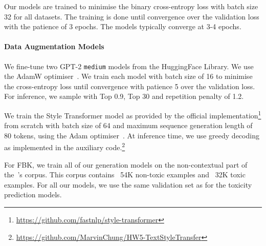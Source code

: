 \documentclass[acmsmall]{acmart}
\begin{document}
Our models are trained to minimise the binary cross-entropy loss with batch size 32 for all datasets. The training is done until convergence over the validation loss with the patience of 3 epochs. The models typically converge at 3-4 epochs.
 
\paragraph{Data Augmentation Models} 

We fine-tune two GPT-2 \texttt{medium} models from the HuggingFace Library. We use the AdamW optimiser~\cite{adamw}. We train each model with batch size of 16 to minimise the cross-entropy loss until convergence with patience 5 over the validation loss. For inference, we sample with Top  0.9, Top  30 and repetition penalty of 1.2.

We train the Style Transformer model as provided by the official implementation\footnote{\url{https://github.com/fastnlp/style-transformer}} from scratch with batch size of 64 and maximum sequence generation length of 80 tokens, using the Adam optimiser~\cite{adam}. At inference time, we use greedy decoding as implemented in the auxiliary code.\footnote{\url{https://github.com/MarvinChung/HW5-TextStyleTransfer}}

For FBK, we train all of our generation models on the non-contextual part of the~\cite{Antigoni}'s corpus. This corpus contains ~54K non-toxic examples and ~32K toxic examples. For all our models, we use the same validation set as for the toxicity prediction models.
\end{document}
